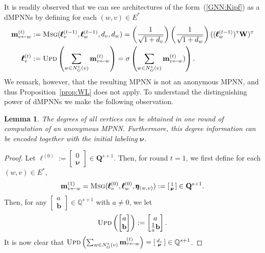 \documentclass[10pt,a4paper]{article}
\newtheorem{lemma}{Lemma}[section]
\theoremstyle{definition}
\begin{document}
It is readily observed that we can see architectures of the form~(\ref{GNN:Kipf}) as a dMPNNs by defining for each $(w,v)\in E^*$
\begin{align*}
\mathbf{m}_{v\gets w}^{(t)}&:=	
\textsc{Msg}(\pmb{\ell}^{(t-1)}_v,\pmb{\ell}^{(t-1)}_w,d_v,d_w)=
	\left(\frac{1}{\sqrt{1+d_v}}\right)	\left(\frac{1}{\sqrt{1+d_w}}\right)((\pmb{\ell}^{(t-1)}_w)^{\textsc{t}}\mathbf{W})^{\textsc{t}}\\
\pmb{\ell}_v^{(t)}&:=\textsc{Upd}\left(\sum_{w\in N_G^*(v)} \mathbf{m}_{v\gets w}^{(t)}\right)=
\sigma\left(\sum_{w\in N_G^*(v)} \mathbf{m}_{v\gets w}^{(t)})\right).
\end{align*}
We remark, however, that the resulting MPNN is not an anonymous MPNN, and thus Proposition~\ref{prop:WL} does not apply. To understand the distinguishing power of dMPNNs we make the following observation. 

\begin{lemma}
	The degrees of all vertices can be obtained in one round of computation of an anonymous MPNN. Furthermore, this degree information can be encoded together with the initial labeling $\pmb{\nu}$.
	\end{lemma}
\begin{proof}
Let $\pmb{\ell}^{(0)}:=\left[\begin{smallmatrix}0\\\pmb{\nu}\end{smallmatrix}\right]\in\mathbf{Q}^{s+1}$. Then, for round $t=1$, we first define for each $(w,v)\in E^*$, 
$$\mathbf{m}^{(1)}_{v\gets w}=\textsc{Msg}(\pmb{\ell}^{(0)}_v,\pmb{\ell}^{(0)}_{w},\pmb{\eta}_{(w,v)}):=\left[\begin{smallmatrix}1\\\pmb{\nu}\end{smallmatrix}\right]\in\mathbf{Q}^{s+1}.$$ Then, for any
$\left[\begin{smallmatrix} a\\\mathbf{b}\end{smallmatrix}\right]\in \mathbb{Q}^{s+1}$ with $a\neq 0$, we 
let 
$$\textsc{Upd}\left(\begin{bmatrix} a\\\mathbf{b}\end{bmatrix}\right):=\begin{bmatrix} a\\\frac{1}{a}\mathbf{b}\end{bmatrix}.
$$
It is now clear that $\textsc{Upd}\left(\sum_{w\in N_G^*(v)}\mathbf{m}_{v\gets w}^{(t)}\right)=\left[\begin{smallmatrix} d_v\\\pmb{\nu}\end{smallmatrix}\right]\in \mathbb{Q}^{s+1}$.
\end{proof}
\end{document}
